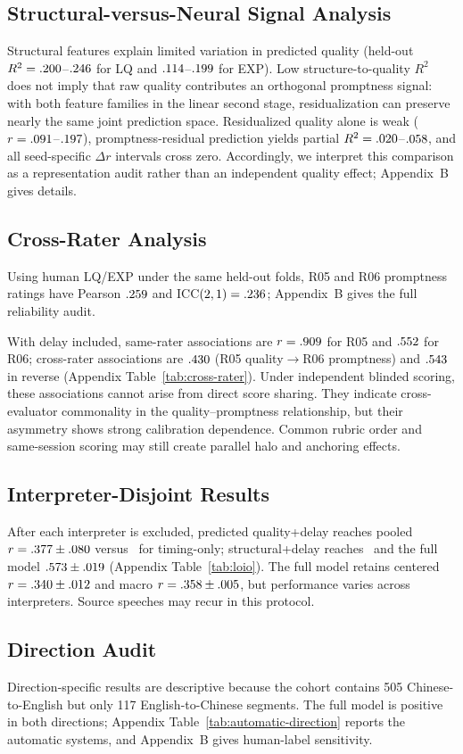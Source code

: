 \subsection{Structural-versus-Neural Signal Analysis}
Structural features explain limited variation in predicted quality (held-out $R^2=.200$--$.246$ for LQ and $.114$--$.199$ for EXP). Low structure-to-quality $R^2$ does not imply that raw quality contributes an orthogonal promptness signal: with both feature families in the linear second stage, residualization can preserve nearly the same joint prediction space. Residualized quality alone is weak ($r=.091$--$.197$), promptness-residual prediction yields partial $R^2=.020$--$.058$, and all seed-specific $\Delta r$ intervals cross zero. Accordingly, we interpret this comparison as a representation audit rather than an independent quality effect; Appendix~B gives details.

\subsection{Cross-Rater Analysis}
Using human LQ/EXP under the same held-out folds, R05 and R06 promptness ratings have Pearson $.259$ and ICC$(2,1)=.236$; Appendix~B gives the full reliability audit.

With delay included, same-rater associations are $r=.909$ for R05 and $.552$ for R06; cross-rater associations are $.430$ (R05 quality$\rightarrow$R06 promptness) and $.543$ in reverse (Appendix Table~\ref{tab:cross-rater}). Under independent blinded scoring, these associations cannot arise from direct score sharing. They indicate cross-evaluator commonality in the quality--promptness relationship, but their asymmetry shows strong calibration dependence. Common rubric order and same-session scoring may still create parallel halo and anchoring effects.

\subsection{Interpreter-Disjoint Results}
After each interpreter is excluded, predicted quality+delay reaches pooled $r=.377\pm.080$ versus \LOIODelayPearson\ for timing-only; structural+delay reaches \LOIOStructureDelayPearson\ and the full model $.573\pm.019$ (Appendix Table~\ref{tab:loio}). The full model retains centered $r=.340\pm.012$ and macro $r=.358\pm.005$, but performance varies across interpreters. Source speeches may recur in this protocol.

\subsection{Direction Audit}
Direction-specific results are descriptive because the cohort contains 505 Chinese-to-English but only 117 English-to-Chinese segments. The full model is positive in both directions; Appendix Table~\ref{tab:automatic-direction} reports the automatic systems, and Appendix~B gives human-label sensitivity.
